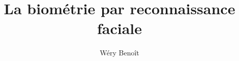 \documentclass{sig-alternate-05-2015}
\begin{document}
\title{La biométrie par reconnaissance faciale}
\author{
Wéry Benoît\\
       \\
       \\
       \affaddr{\today}\\
}
\maketitle

\begin{abstract}
\end{abstract}











\end{document}
